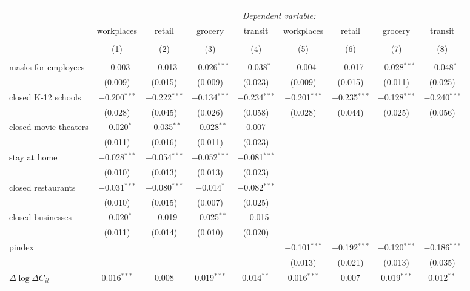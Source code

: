 \begin{tabular}{@{\extracolsep{1pt}}lcccccccc} 
\\[-1.8ex]\hline 
\hline \\[-1.8ex] 
 & \multicolumn{8}{c}{\textit{Dependent variable:}} \\ 
\cline{2-9} 
 & workplaces & retail & grocery & transit & workplaces & retail & grocery & transit \\ 
\\[-1.8ex] & (1) & (2) & (3) & (4) & (5) & (6) & (7) & (8)\\ 
\hline \\[-1.8ex] 
 masks for employees & $-$0.003 & $-$0.013 & $-$0.026$^{***}$ & $-$0.038$^{*}$ & $-$0.004 & $-$0.017 & $-$0.028$^{***}$ & $-$0.048$^{*}$ \\ 
  & (0.009) & (0.015) & (0.009) & (0.023) & (0.009) & (0.015) & (0.011) & (0.025) \\ 
  closed K-12 schools & $-$0.200$^{***}$ & $-$0.222$^{***}$ & $-$0.134$^{***}$ & $-$0.234$^{***}$ & $-$0.201$^{***}$ & $-$0.235$^{***}$ & $-$0.128$^{***}$ & $-$0.240$^{***}$ \\ 
  & (0.028) & (0.045) & (0.026) & (0.058) & (0.028) & (0.044) & (0.025) & (0.056) \\ 
  closed movie theaters & $-$0.020$^{*}$ & $-$0.035$^{**}$ & $-$0.028$^{**}$ & 0.007 &  &  &  &  \\ 
  & (0.011) & (0.016) & (0.011) & (0.023) &  &  &  &  \\ 
  stay at home & $-$0.028$^{***}$ & $-$0.054$^{***}$ & $-$0.052$^{***}$ & $-$0.081$^{***}$ &  &  &  &  \\ 
  & (0.010) & (0.013) & (0.013) & (0.023) &  &  &  &  \\ 
  closed restaurants & $-$0.031$^{***}$ & $-$0.080$^{***}$ & $-$0.014$^{*}$ & $-$0.082$^{***}$ &  &  &  &  \\ 
  & (0.010) & (0.015) & (0.007) & (0.025) &  &  &  &  \\ 
  closed businesses & $-$0.020$^{*}$ & $-$0.019 & $-$0.025$^{**}$ & $-$0.015 &  &  &  &  \\ 
  & (0.011) & (0.014) & (0.010) & (0.020) &  &  &  &  \\ 
  pindex &  &  &  &  & $-$0.101$^{***}$ & $-$0.192$^{***}$ & $-$0.120$^{***}$ & $-$0.186$^{***}$ \\ 
  &  &  &  &  & (0.013) & (0.021) & (0.013) & (0.035) \\ 
  $\Delta \log \Delta C_{it}$ & 0.016$^{***}$ & 0.008 & 0.019$^{***}$ & 0.014$^{**}$ & 0.016$^{***}$ & 0.007 & 0.019$^{***}$ & 0.012$^{**}$ \\ 

\end{tabular}
